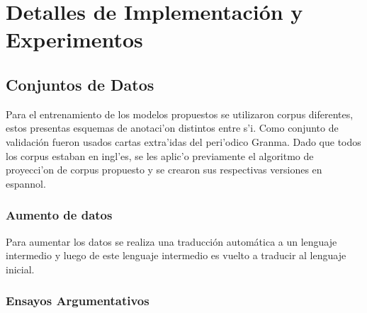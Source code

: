 \chapter{Detalles de Implementación y Experimentos}\label{chapter:implementation}


\section{Conjuntos de Datos}

Para el entrenamiento de los modelos propuestos se utilizaron corpus diferentes, estos
presentas esquemas de anotaci'on distintos entre s'i. Como conjunto de validación fueron
usados cartas extra'idas del peri'odico Granma. Dado que todos los corpus estaban en ingl'es, 
se les aplic'o previamente el algoritmo de proyecci'on de corpus propuesto y se crearon sus respectivas
versiones en espannol.

\subsection{Aumento de datos}

Para aumentar los datos se realiza una traducción automática a un lenguaje intermedio y luego de este lenguaje 
intermedio es vuelto a traducir al lenguaje inicial.

\subsection{Ensayos Argumentativos}\label{corpus:persuasive_essays}


